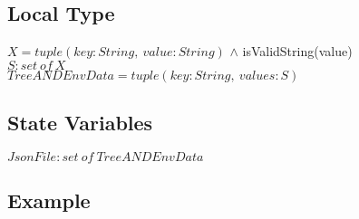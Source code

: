 \documentclass[12pt, titlepage]{article}
\begin{document}
\subsection{Local Type}
$X = tuple(key:String,\ value:String)$ $\land$ 
isValidString(value) \\
$S : set\ of\ X$\\
$TreeANDEnvData = tuple(key:String,\ values: S)$

\subsection{State Variables}
$JsonFile : set\ of\ TreeANDEnvData$


\subsection{Example}
\end{document}
